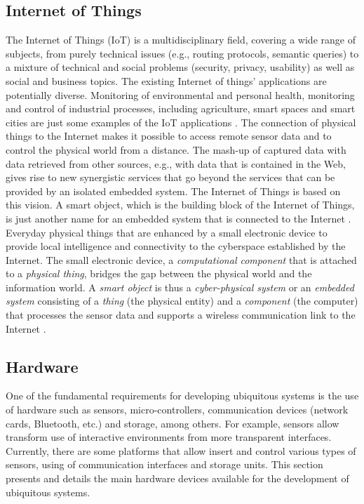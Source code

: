 \documentclass{acm_proc_article-sp}
\begin{document}
\subsection{Internet of Things}
The Internet of Things (IoT) is a multidisciplinary field, covering a wide range of subjects, from purely technical issues (e.g., routing protocols, semantic queries) to a mixture of technical and social problems (security, privacy, usability) as well as social and business topics. The existing Internet of things' applications are potentially diverse. Monitoring of environmental and personal health, monitoring and control of industrial processes, including agriculture, smart spaces and smart cities are just some examples of the IoT applications \cite{krishnakumarframework}.
\newline
\newline
The connection of physical things to the Internet makes it possible to access remote sensor data and to control the physical world from a distance. The mash-up of captured data with data retrieved from other sources, e.g., with data that is contained in the Web, gives rise to new synergistic services that go beyond the services that can be provided by an isolated embedded system. The Internet of Things is based on this vision. A smart object, which is the building block of the Internet of Things, is just another name for an embedded system that is connected to the Internet \cite{Kopetz:1997}.
\newline
\newline
Everyday physical things that are enhanced by a small electronic device to provide local intelligence and connectivity to the cyberspace established by the Internet. The small electronic device, a \textit{computational component} that is attached to a \textit{physical thing}, bridges the gap between the physical world and the information world. A \textit{smart object} is thus a \textit{cyber-physical system} or an \textit{embedded system} consisting of a \textit{thing} (the physical entity) and a \textit{component} (the computer) that processes the sensor data and supports a wireless communication link to the Internet \cite{Kopetz:1997}.

\subsection{Hardware}
One of the fundamental requirements for developing ubiquitous systems is the use of hardware such as sensors, micro-controllers, communication devices (network cards, Bluetooth, etc.) and storage, among others. For example, sensors allow transform use of interactive environments from more transparent interfaces. Currently, there are some platforms that allow insert and control various types of sensors, using of communication interfaces and storage units. This section presents and details the main hardware devices available for the development of ubiquitous systems.
\end{document}
